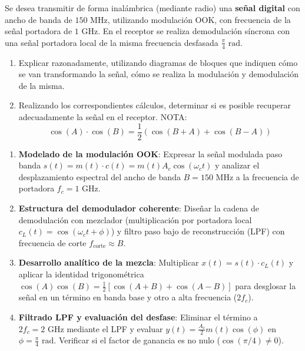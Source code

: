 \begin{resolucion}
{

\newpage

\begin{problema}
Se desea transmitir de forma inalámbrica (mediante radio) una \textbf{señal digital} con ancho de banda de $150\text{ MHz}$, utilizando modulación OOK, con frecuencia de la señal portadora de $1\text{ GHz}$. En el receptor se realiza demodulación síncrona con una señal portadora local de la misma frecuencia desfasada $\frac{\pi}{4}\text{ rad}$.

\begin{enumerate}[label=\alph*)]
    \item Explicar razonadamente, utilizando diagramas de bloques que indiquen cómo se van transformando la señal, cómo se realiza la modulación y demodulación de la misma.
    \item Realizando los correspondientes cálculos, determinar si es posible recuperar adecuadamente la señal en el receptor. NOTA:
    \[
    \cos(A) \cdot \cos(B) = \frac{1}{2} (\cos(B + A) + \cos(B - A))
    \]
\end{enumerate}
\end{problema}

\begin{mecanizado}
\begin{enumerate}
    \item \textbf{Modelado de la modulación OOK}: Expresar la señal modulada paso banda $s(t) = m(t) \cdot c(t) = m(t) A_c \cos(\omega_c t)$ y analizar el desplazamiento espectral del ancho de banda $B = 150\text{ MHz}$ a la frecuencia de portadora $f_c = 1\text{ GHz}$.
    \item \textbf{Estructura del demodulador coherente}: Diseñar la cadena de demodulación con mezclador (multiplicación por portadora local $c_L(t) = \cos(\omega_c t + \phi)$) y filtro paso bajo de reconstrucción (LPF) con frecuencia de corte $f_{\text{corte}} \approx B$.
    \item \textbf{Desarrollo analítico de la mezcla}: Multiplicar $x(t) = s(t) \cdot c_L(t)$ y aplicar la identidad trigonométrica $\cos(A)\cos(B) = \frac{1}{2}[\cos(A+B) + \cos(A-B)]$ para desglosar la señal en un término en banda base y otro a alta frecuencia ($2f_c$).
    \item \textbf{Filtrado LPF y evaluación del desfase}: Eliminar el término a $2f_c = 2\text{ GHz}$ mediante el LPF y evaluar $y(t) = \frac{A_c}{2} m(t) \cos(\phi)$ en $\phi = \frac{\pi}{4}\text{ rad}$. Verificar si el factor de ganancia es no nulo ($\cos(\pi/4) \neq 0$).
\end{enumerate}
\end{mecanizado}

}
\end{resolucion}

